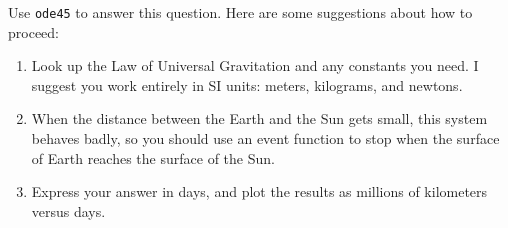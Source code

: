 Use \lstinline{ode45} to answer this question.  Here are some suggestions about how to proceed:

\begin{enumerate}

\item Look up the Law of Universal Gravitation and any constants you need. I suggest you work entirely in SI units: meters, kilograms, and newtons.

\item When the distance between the Earth and the Sun gets small, this system behaves badly, so you should use an event function to stop when the surface of Earth reaches the surface of the Sun.

\item Express your answer in days, and plot the results as millions of kilometers versus days.

\end{enumerate}




